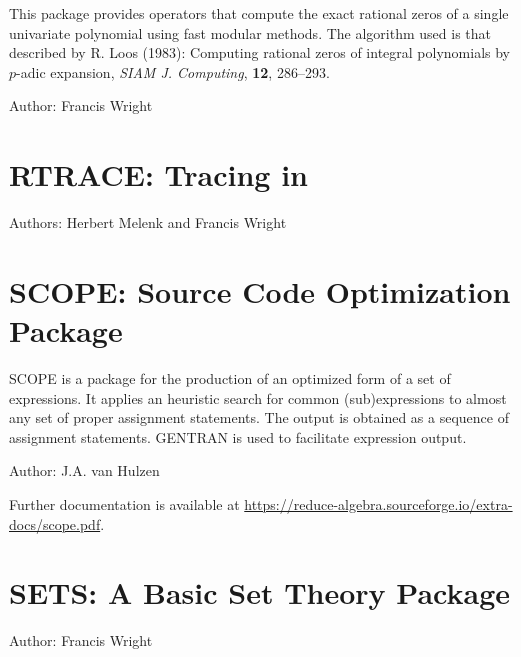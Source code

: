 
This package provides operators that compute the exact rational zeros
of a single univariate polynomial using fast modular methods.  The
algorithm used is that described by R. Loos (1983): Computing rational
zeros of integral polynomials by $p$-adic expansion, \textit{SIAM J.
Computing}, \textbf{12}, 286--293.

Author: Francis Wright



\newpage
\section{RTRACE: Tracing in \REDUCE}

Authors: Herbert Melenk and Francis Wright



\newpage
\fi

\section{SCOPE: \REDUCE Source Code Optimization Package}
\label{SCOPE}

SCOPE is a package for the production of an optimized form of a set of
expressions.  It applies an heuristic search for common (sub)expressions
to almost any set of proper \REDUCE assignment statements.  The
output is obtained as a sequence of assignment statements.  GENTRAN is
used to facilitate expression output.

Author: J.A. van Hulzen

\begin{sloppypar}
  Further documentation is available at
  \url{https://reduce-algebra.sourceforge.io/extra-docs/scope.pdf}.
\end{sloppypar}

\newpage

\section{SETS: A Basic Set Theory Package}


Author: Francis Wright

